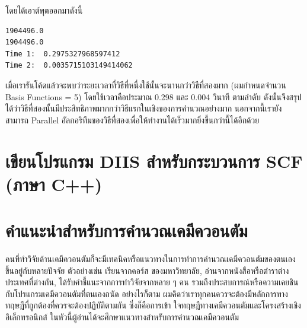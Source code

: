 \vspace{5pt}

\noindent โดยได้เอาต์พุตออกมาดังนี้

\vspace{5pt}

\begin{lstlisting}
1904496.0
1904496.0
Time 1:  0.2975327968597412
Time 2:  0.0035715103149414062
\end{lstlisting}

\vspace{5pt}

เมื่อเรารันโค้ดแล้วจะพบว่าระยะเวลาที่วิธีที่หนึ่งใช้นั้นจะนานกว่าวิธีที่สองมาก (ผมกำหนดจำนวน Basis Functions = 5) โดยใช้เวลาคือประมาณ
0.298 และ 0.004 วินาที ตามลำดับ ดังนั้นจึงสรุปได้ว่าวิธีที่สองนั้นมีประสิทธิภาพมากกว่าวิธีแรกในเชิงของการคำนวณอย่างมาก นอกจากนี้เรายังสามารถ
Parallel อัลกอริทึมของวิธีที่สองเพื่อให้ทำงานได้เร็วมากยิ่งขึ้นกว่านี้ได้อีกด้วย

\section{เขียนโปรแกรม DIIS สำหรับกระบวนการ SCF (ภาษา C++)}

\section{คำแนะนำสำหรับการคำนวณเคมีควอนตัม}

คนที่ทำวิจัยด้านเคมีควอนตัมก็จะมีเทคนิคหรือแนวทางในการทำการคำนวณเคมีควอนตัมของตนเอง ขึ้นอยู่กับหลายปัจจัย ตัวอย่างเช่น เรียนจากคอร์ส%
ของมหาวิทยาลัย, อ่านจากหนังสือหรือตำราต่างประเทศที่ต่างกัน, ได้รับคำชี้แนะจากการทำวิจัยจากหลาย ๆ คน รวมถึงประสบการณ์หรือความเคยชิน%
กับโปรแกรมเคมีควอนตัมที่ตนเองถนัด อย่างไรก็ตาม ผมคิดว่าเราทุกคนควรจะต้องมีหลักการทางทฤษฎีที่ถูกต้องที่ควรจะต้องปฏิบัติตามกัน ซึ่งก็คือการเข้า%
ใจทฤษฎีทางเคมีควอนตัมและโครงสร้างเชิงอิเล็กทรอนิกส์ ในหัวนี้ผู้อ่านได้จะศึกษาแนวทางสำหรับการคำนวณเคมีควอนตัม

